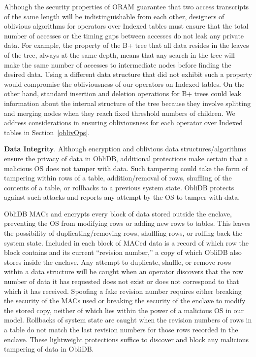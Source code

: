\documentclass[letterpaper,twocolumn,10pt]{article}
\def\name/{ObliDB}
\begin{document}
Although the security properties of ORAM guarantee that two access transcripts of the same length will be indistinguishable from each other, designers of oblivious algorithms for operators over Indexed tables must ensure that the total number of accesses or the timing gaps between accesses do not leak any private data. For example, the property of the B+ tree that all data resides in the leaves of the tree, always at the same depth, means that any search in the tree will make the same number of accesses to intermediate nodes before finding the desired data. Using a different data structure that did not exhibit such a property would compromise the obliviousness of our operators on Indexed tables. On the other hand, standard insertion and deletion operations for B+ trees could leak information about the internal structure of the tree because they involve splitting and merging nodes when they reach fixed threshold numbers of children. We address considerations in ensuring obliviousness for each operator over Indexed tables in Section~\ref{oblivOps}.  

 \noindent \textbf{Data Integrity}. 
Although encryption and oblivious data structures/algorithms ensure the privacy of data in \name/, additional protections make certain that a malicious OS does not tamper with data. Such tampering could take the form of tampering within rows of a table, addition/removal of rows, shuffling of the contents of a table, or rollbacks to a previous system state. \name/ protects against such attacks and reports any attempt by the OS to tamper with data. 

\name/ MACs and encrypts every block of data stored outside the enclave, preventing the OS from modifying rows or adding new rows to tables. This leaves the possibility of duplicating/removing rows, shuffling rows, or rolling back the system state. Included in each block of MACed data is a record of which row the block contains and its current ``revision number,'' a copy of which \name/ also stores inside the enclave. Any attempt to duplicate, shuffle, or remove rows within a data structure will be caught when an operator discovers that the row number of data it has requested does not exist or does not correspond to that which it has received. Spoofing a fake revision number requires either breaking the security of the MACs used or breaking the security of the enclave to modify the stored copy, neither of which lies within the power of a malicious OS in our model. Rollbacks of system state are caught when the revision numbers of rows in a table do not match the last revision numbers for those rows recorded in the enclave. These lightweight protections suffice to discover and block any malicious tampering of data in \name/.
\end{document}
